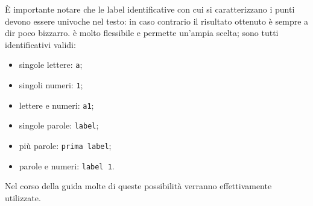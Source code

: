 È importante notare che le label identificative con cui si caratterizzano i punti devono essere univoche nel testo: in caso contrario il risultato ottenuto è sempre a dir poco bizzarro. \Tikz{} è molto flessibile e permette un'ampia scelta; sono tutti identificativi validi:
\begin{itemize}
\item singole lettere: \texttt{a};
\item singoli numeri: \texttt{1};
\item lettere e numeri: \texttt{a1};
\item singole parole: \texttt{label};
\item più parole: \texttt{prima label};
\item parole e numeri: \texttt{label 1}.
\end{itemize}
Nel corso della guida molte di queste possibilità verranno effettivamente utilizzate.
